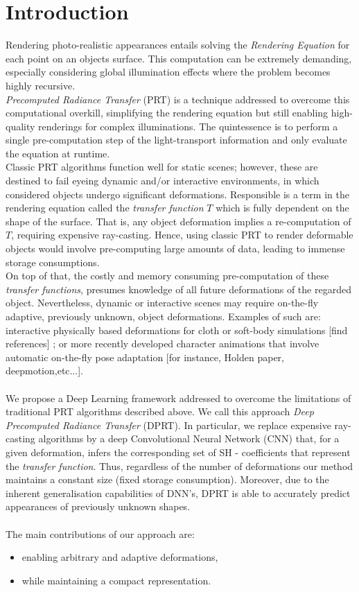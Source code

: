 \section{Introduction}
Rendering photo-realistic appearances entails solving the \textit{Rendering Equation} for each point on an objects surface. This computation can be extremely demanding, especially considering global illumination effects where the problem becomes highly recursive. \\
\textit{Precomputed Radiance Transfer} (PRT) is a technique addressed to overcome this computational overkill, simplifying the rendering equation but still enabling high-quality renderings for complex illuminations. The quintessence is to perform a single pre-computation step of the light-transport information and only evaluate the equation at runtime.\\
Classic PRT algorithms function well for static scenes; however, these are destined to fail eyeing dynamic and/or interactive environments, in which considered objects undergo significant deformations.
Responsible is a term in the rendering equation called the \textit{transfer function} $T$ which is fully dependent on the shape of the surface. That is, any object deformation implies a re-computation of $T$,  requiring expensive ray-casting. Hence, using classic PRT to render deformable objects would involve pre-computing large amounts of data, leading to immense storage consumptions. \\
On top of that, the costly and memory consuming pre-computation of these \textit{transfer functions}, presumes knowledge of all future deformations of the regarded object. Nevertheless, dynamic or interactive scenes may require on-the-fly adaptive, previously unknown, object deformations. Examples of such are: 
interactive physically based deformations for cloth or soft-body simulations [find references] ; 
or more recently developed character animations that involve automatic on-the-fly pose adaptation [for instance, Holden paper, deepmotion,etc...]. \\
\\
We propose a Deep Learning framework addressed to overcome the limitations of traditional PRT algorithms described above. We call this approach \textit{Deep Precomputed Radiance Transfer} (DPRT). In particular, we replace expensive ray-casting algorithms by a deep Convolutional Neural Network (CNN) that, for a given deformation, infers the corresponding set of SH - coefficients that represent the \textit{transfer function}. 
Thus, regardless of the number of deformations our method maintains a constant size (fixed storage consumption). Moreover, due to the inherent generalisation capabilities of DNN's, DPRT is able to accurately predict appearances of previously unknown shapes. \\
\\
The main contributions of our approach are: 
\begin{itemize}
\item enabling arbitrary and adaptive deformations,
\item while maintaining a compact representation. 
\end{itemize}
